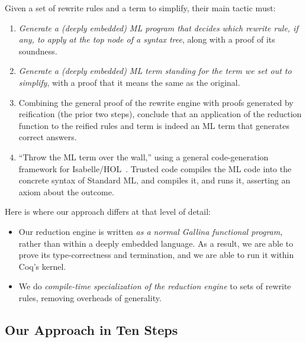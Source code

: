 \documentclass[sn-mathphys,pdflatex]{sn-jnl}%
\theoremstyle{thmstyleone}%
\theoremstyle{thmstyletwo}%
\theoremstyle{thmstylethree}%
\begin{document}
Given a set of rewrite rules and a term to simplify, their main tactic must:
\begin{enumerate}
\item
  \emph{Generate a (deeply embedded) ML program that decides which rewrite rule, if any, to apply at the top node of a syntax tree}, along with a proof of its soundness.
\item
  \emph{Generate a (deeply embedded) ML term standing for the term we set out to simplify}, with a proof that it means the same as the original.
\item
  Combining the general proof of the rewrite engine with proofs generated by reification (the prior two steps), conclude that an application of the reduction function to the reified rules and term is indeed an ML term that generates correct answers.
\item
  ``Throw the ML term over the wall,'' using a general code-generation framework for Isabelle/HOL~\cite{CodeGen}.
  Trusted code compiles the ML code into the concrete syntax of Standard ML, and compiles it, and runs it, asserting an axiom about the outcome.
\end{enumerate}

Here is where our approach differs at that level of detail:
\begin{itemize}
\item
  Our reduction engine is written \emph{as a normal Gallina functional program}, rather than within a deeply embedded language.
  As a result, we are able to prove its type-correctness and termination, and we are able to run it within Coq's kernel.
\item
  We do \emph{compile-time specialization of the reduction engine} to sets of rewrite rules, removing overheads of generality.
\end{itemize}

\subsection{Our Approach in Ten Steps}\label{sec:nine-steps}
\end{document}
